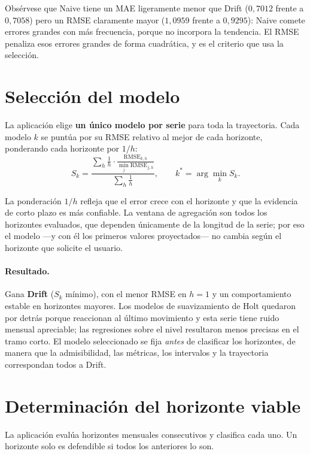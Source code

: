\documentclass[11pt,letterpaper]{article}
\begin{document}
Obsérvese que Naive tiene un MAE ligeramente menor que Drift
(\(0{,}7012\) frente a \(0{,}7058\)) pero un RMSE claramente mayor
(\(1{,}0959\) frente a \(0{,}9295\)): Naive comete errores grandes con más
frecuencia, porque no incorpora la tendencia. El RMSE penaliza esos errores
grandes de forma cuadrática, y es el criterio que usa la selección.

\section{Selección del modelo}

La aplicación elige \textbf{un único modelo por serie} para toda la
trayectoria. Cada modelo \(k\) se puntúa por su RMSE relativo al mejor de cada
horizonte, ponderando cada horizonte por \(1/h\):
\begin{equation}
S_k=\frac{\displaystyle\sum_{h}\frac{1}{h}\cdot\frac{\mathrm{RMSE}_{k,h}}{\min_j \mathrm{RMSE}_{j,h}}}
{\displaystyle\sum_{h}\frac{1}{h}},
\qquad
k^{*}=\arg\min_k S_k .
\end{equation}

La ponderación \(1/h\) refleja que el error crece con el horizonte y que la
evidencia de corto plazo es más confiable. La ventana de agregación son todos
los horizontes evaluados, que dependen únicamente de la longitud de la serie;
por eso el modelo ---y con él los primeros valores proyectados--- no cambia
según el horizonte que solicite el usuario.

\paragraph{Resultado.} Gana \textbf{Drift} (\(S_k\) mínimo), con el menor RMSE
en \(h=1\) y un comportamiento estable en horizontes mayores. Los modelos de
suavizamiento de Holt quedaron por detrás porque reaccionan al último
movimiento y esta serie tiene ruido mensual apreciable; las regresiones sobre
el nivel resultaron menos precisas en el tramo corto. El modelo seleccionado se
fija \emph{antes} de clasificar los horizontes, de manera que la admisibilidad,
las métricas, los intervalos y la trayectoria correspondan todos a Drift.

\section{Determinación del horizonte viable}

La aplicación evalúa horizontes mensuales consecutivos y clasifica cada uno.
Un horizonte solo es defendible si todos los anteriores lo son.
\end{document}
